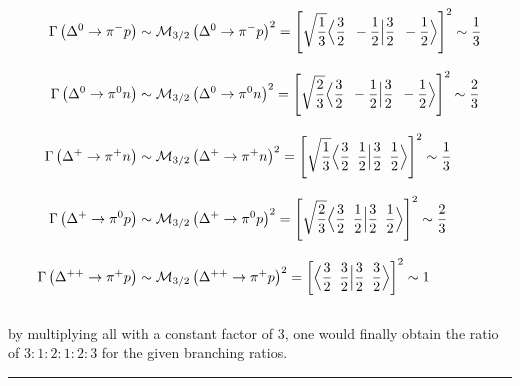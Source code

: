 \begin{solution}
\begin{align*}
    \Gamma\left( \Delta^0 \to \pi^- p \right) &\sim \mathcal{M}_{3/2} \left( \Delta^0 \to \pi^- p \right)^2 = \left[ \sqrt{\frac{1}{3}}   \Big\langle \frac{3}{2} \hskip0.5em\relax -\frac{1}{2}  \Big| \frac{3}{2}  \hskip0.5em\relax- \frac{1}{2} \Big\rangle   \right]^2 \sim \frac{1}{3} \\[0.12in]
    \Gamma\left( \Delta^0 \to \pi^0 n \right) &\sim \mathcal{M}_{3/2} \left( \Delta^0 \to \pi^0 n  \right)^2 = \left[ \sqrt{\frac{2}{3}}   \Big\langle \frac{3}{2}  \hskip0.5em\relax -\frac{1}{2}  \Big| \frac{3}{2}  \hskip0.5em\relax- \frac{1}{2} \Big\rangle   \right]^2 \sim \frac{2}{3} \\[0.12in]
    \Gamma\left( \Delta^+ \to \pi^+ n \right) &\sim \mathcal{M}_{3/2} \left( \Delta^+ \to \pi^+ n  \right)^2 = \left[ \sqrt{\frac{1}{3}}   \Big\langle \frac{3}{2}  \hskip0.5em\relax \frac{1}{2}  \Big| \frac{3}{2}  \hskip0.5em\relax \frac{1}{2} \Big\rangle   \right]^2 \sim \frac{1}{3} \\[0.12in]
    \Gamma\left( \Delta^+ \to \pi^0 p \right) &\sim \mathcal{M}_{3/2} \left( \Delta^+ \to \pi^0 p  \right)^2 = \left[ \sqrt{\frac{2}{3}}   \Big\langle \frac{3}{2}  \hskip0.5em\relax \frac{1}{2}  \Big| \frac{3}{2}  \hskip0.5em\relax \frac{1}{2} \Big\rangle   \right]^2 \sim \frac{2}{3} \\[0.12in]
    \Gamma\left( \Delta^{++} \to \pi^+ p \right) &\sim \mathcal{M}_{3/2} \left( \Delta^{++} \to \pi^+ p  \right)^2 = \left[     \Big\langle \frac{3}{2}  \hskip0.5em\relax \frac{3}{2}  \Big| \frac{3}{2}  \hskip0.5em\relax \frac{3}{2} \Big\rangle   \right]^2 \sim 1  
\end{align*}\\[0.12in]
by multiplying all with a constant factor of 3, one would finally obtain the ratio of $\boxed{3:1:2:1:2:3}$ for the given branching ratios. 
\end{solution}

\noindent\rule{7in}{1.5pt}


